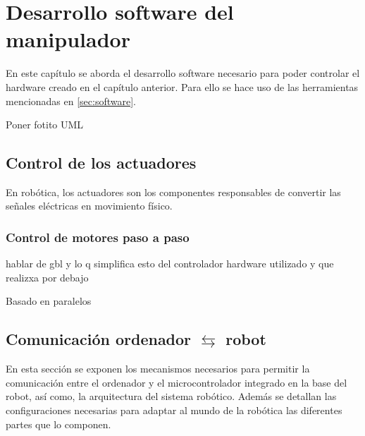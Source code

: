 \chapter{Desarrollo software del manipulador}
\label{cap:capitulo6}

\vspace{1cm}

En este capítulo se aborda el desarrollo software necesario para poder controlar el hardware creado en el capítulo anterior. Para ello 
se hace uso de las herramientas mencionadas en \ref{sec:software}.

Poner fotito UML 

\section{Control de los actuadores}
En robótica, los actuadores son los componentes responsables de convertir las señales eléctricas en movimiento físico. 

\subsection{Control de motores paso a paso}
\label{subsec:control_pap}
hablar de gbl y lo q simplifica esto
del controlador hardware utilizado y que realizxa por debajo

Basado en paralelos

\section{Comunicación ordenador $\leftrightarrows$ robot}
En esta sección se exponen los mecanismos necesarios para permitir la comunicación entre el ordenador y el microcontrolador 
integrado en la base del robot, así como, la arquitectura del sistema robótico. Además se detallan las configuraciones necesarias 
para adaptar al mundo de la robótica las diferentes partes que lo componen.

